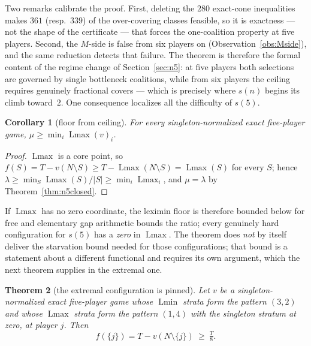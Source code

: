 \documentclass[11pt]{article}
\newtheorem{theorem}{Theorem}
\newtheorem{corollary}[theorem]{Corollary}
\newcommand{\Lmin}{\operatorname{Lmin}}
\newcommand{\Lmax}{\operatorname{Lmax}}
\begin{document}
Two remarks calibrate the proof.  First, deleting the $280$ exact-cone
inequalities makes $361$ (resp.\ $339$) of the over-covering classes
feasible, so it is exactness --- not the shape of the certificate --- that
forces the one-coalition property at five players.  Second, the $M$-side is
false from six players on (Observation~\ref{obs:Mside}), and the same
reduction detects that failure.  The theorem is therefore the formal content
of the regime change of Section~\ref{sec:n5}: at five players both
selections are governed by single bottleneck coalitions, while from six
players the ceiling requires genuinely fractional covers --- which is
precisely where $s(n)$ begins its climb toward~$2$.  One consequence localizes all the difficulty of $s(5)$.

\begin{corollary}[floor from ceiling]\label{cor:floorceiling}
For every singleton-normalized exact five-player game,
$\mu\ge\min_i\Lmax(v)_i$.
\end{corollary}

\begin{proof}
$\Lmax$ is a core point, so $f(S)=T-v(N\setminus S)\ge
T-\Lmax(N\setminus S)=\Lmax(S)$ for every $S$; hence
$\lambda\ge\min_S\Lmax(S)/|S|\ge\min_i\Lmax_i$, and $\mu=\lambda$ by
Theorem~\ref{thm:n5closed}.
\end{proof}

If $\Lmax$ has no zero coordinate, the leximin floor is therefore bounded
below for free and elementary gap arithmetic bounds the ratio; every
genuinely hard configuration for $s(5)$ has a \emph{zero} in $\Lmax$.  The
theorem does \emph{not} by itself deliver the starvation bound needed for
those configurations; that bound is a statement about a different functional
and requires its own argument, which the next theorem supplies in the
extremal one.

\begin{theorem}[the extremal configuration is pinned]\label{thm:cfg}
Let $v$ be a singleton-normalized exact five-player game whose $\Lmin$
strata form the pattern $(3,2)$ and whose $\Lmax$ strata form the pattern
$(1,4)$ with the singleton stratum at zero, at player $j$.  Then
\[
 f(\{j\})=T-v(N\setminus\{j\})\ \ge\ \tfrac{T}8 .
\]
\end{theorem}
\end{document}
